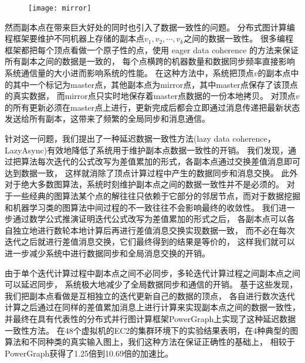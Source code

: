 \begin{figure}[!htbp]
  \centering
  \texttt{[image: mirror]}
  \label{fig:mirror}
\end{figure}

然而副本点在带来巨大好处的同时也引入了数据一致性的问题。
分布式图计算编程框架要维护不同机器上存储的副本点$v_1, v_2, \cdots, v_k$之间的数据一致性。
很多编程框架都把每个顶点看做一个原子性的点，使用 eager data coherence 的方法来保证所有副本之间的数据是一致的，
每个点横跨的机器数量和数据同步频率直接影响系统通信量的大小进而影响系统的性能。
在这种方法中，系统把顶点$v$的副本点中的其中一个标记为master点，其他副本点为mirror点，其中master点保存了该顶点的真实数据，
而mirror点只实时地保存着master点数据的一份本地拷贝。
对顶点$v$的所有更新必须在master点上进行，更新完成后都会立即通过消息传递把最新状态发送给所有副本，这带来了频繁的全局同步和消息通信。

针对这一问题，我们提出了一种延迟数据一致性方法(lazy data coherence，LazyAsync)\cite{Wang@PPoPP18}有效地降低了系统用于维护副本点数据一致性的开销。
我们发现，通过把算法每次迭代的公式改写为差值累加的形式，各副本点通过交换差值消息即可达到数据一致，
这样就消除了顶点计算过程中产生的数据同步和消息交换。
此外对于绝大多数图算法，系统时刻维护副本点之间的数据一致性并不是必须的。
对于一些经典的图算法某个点的解往往只依赖于它部分的邻居节点，而对于数据挖掘和机器学习类的图算法中间过程的不一致往往不会影响最终的收敛性。
我们进一步通过数学公式推演证明迭代公式改写为差值累加的形式之后，
各副本点可以各自独立地进行数轮本地计算后再进行差值消息交换实现数据一致，
而不必在每次迭代之后就进行差值消息交换，它们最终得到的结果是等价的，
这样我们就可以进一步减少系统中进行数据同步和全局消息交换的开销。

由于单个迭代计算过程中副本点之间不必同步，多轮迭代计算过程之间副本点之间可以延迟同步，
系统极大地减少了全局数据同步和通信的开销。
基于这些发现，我们把副本点看做是互相独立的迭代更新自己的数据的顶点，
  各自进行数次迭代计算之后通过在同样的差值累加消息上进行计算来实现副本点之间的数据一致性，
并最终在具有代表性的分布式并行图计算框架PowerGraph\cite{Gonzalez@OSDI12}上实现了这种延迟数据一致性方法。
在48个虚拟机的EC2的集群环境下的实验结果表明，在4种典型的图算法和不同种类的真实输入图上，我们这种方法在保证正确性的基础上，
相较于PowerGraph获得了1.25倍到10.69倍的加速比。


